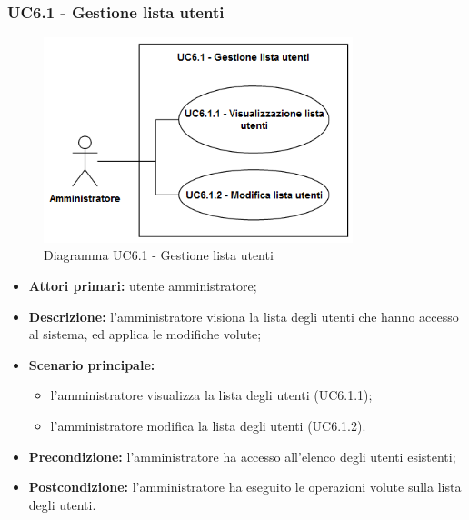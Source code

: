 \subsubsection{UC6.1 - Gestione lista utenti}
	\begin{figure}[H]
		\centering
		\includegraphics[width=9cm]{images/UC6.1.png}
		\caption{Diagramma UC6.1 - Gestione lista utenti}
	\end{figure}
	\begin{itemize}
		\item \textbf{Attori primari:} utente amministratore;
		\item \textbf{Descrizione:} l'amministratore visiona la lista degli utenti che hanno accesso al sistema, ed applica le modifiche volute;
		\item \textbf{Scenario principale:} 
			\begin{itemize}
				\item l'amministratore visualizza la lista degli utenti (UC6.1.1);
				\item l'amministratore modifica la lista degli utenti (UC6.1.2).
			\end{itemize}
		\item \textbf{Precondizione:} l'amministratore ha accesso all'elenco degli utenti esistenti;
		\item \textbf{Postcondizione:} l'amministratore ha eseguito le operazioni volute sulla lista degli utenti.
	\end{itemize}

